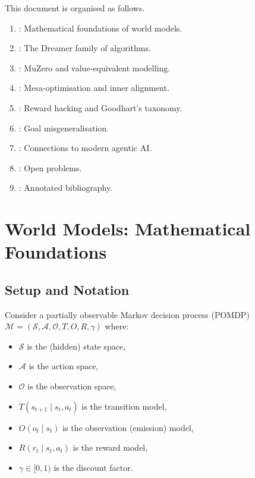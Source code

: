 \documentclass[11pt,a4paper]{article}
\theoremstyle{definition}
\begin{document}
This document is organised as follows.
\begin{enumerate}[label=\arabic*.]
  \item {}: Mathematical foundations of world models.
  \item {}: The Dreamer family of algorithms.
  \item {}: MuZero and value-equivalent modelling.
  \item {}: Mesa-optimisation and inner alignment.
  \item {}: Reward hacking and Goodhart's taxonomy.
  \item {}: Goal misgeneralisation.
  \item {}: Connections to modern agentic AI.
  \item {}: Open problems.
  \item {}: Annotated bibliography.
\end{enumerate}

\section{World Models: Mathematical Foundations}\label{sec:world_models}

\subsection{Setup and Notation}

Consider a partially observable Markov decision process (POMDP)
$\mathcal{M} = (\mathcal{S}, \mathcal{A}, \mathcal{O}, T, O, R, \gamma)$
where:
\begin{itemize}
  \item $\mathcal{S}$ is the (hidden) state space,
  \item $\mathcal{A}$ is the action space,
  \item $\mathcal{O}$ is the observation space,
  \item $T(s_{t+1}\mid s_t, a_t)$ is the transition model,
  \item $O(o_t \mid s_t)$ is the observation (emission) model,
  \item $R(r_t \mid s_t, a_t)$ is the reward model,
  \item $\gamma \in [0,1)$ is the discount factor.
\end{itemize}
\end{document}
